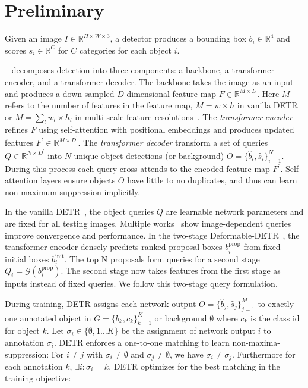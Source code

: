 \documentclass[10pt,twocolumn,letterpaper]{article}
\newcommand{\myparagraph}[1]{\vspace{2pt}\noindent{\textbf{#1}}}
\newcommand{\prop}{{\text{prop}}}
\newcommand{\init}{{\text{init}}}
\begin{document}
\section{Preliminary}


Given an image $I\in\mathbb{R}^{H\times W\times 3}$, a detector produces a bounding box $b_i\in\mathbb{R}^4$ and scores $s_i\in\mathbb{R}^{C}$ for $C$ categories for each object $i$.

\myparagraph{DETR}~\cite{carion2020end} decomposes detection into three components: a backbone, a transformer encoder, and a transformer decoder.
The backbone takes the image as an input and produces a down-sampled $D$-dimensional feature map $F\in\mathbb{R}^{M\times D}$.
Here $M$ refers to the number of features in the feature map,
$M=w \times h$ in vanilla DETR~\cite{carion2020end} or $M=\sum_l w_l \times h_l$ in multi-scale feature resolutions~\cite{zhu2020deformable}.
The \emph{transformer encoder} refines $F$ using self-attention with positional embeddings and produces updated features $F^\prime\in\mathbb{R}^{M \times D^\prime}$.
The \emph{transformer decoder} transform a set of queries $Q\in \mathbb{R}^{N\times D^\prime}$ into $N$ unique object detections (or background) $O = \{\hat{b}_i, \hat{s}_i\}_{i=1}^N$.
During this process each query cross-attends to the encoded feature map $F^\prime$.
Self-attention layers ensure objects $O$ have little to no duplicates, and thus can learn non-maximum-suppression implicitly.










\myparagraph{Two-stage DETR.} In the vanilla DETR~\cite{carion2020end}, the object queries $Q$ are learnable network parameters and are fixed for all testing images.
Multiple works~\cite{zhu2020deformable,sun2020rethinking,yao2021efficient,zhang2022dino} show image-dependent queries improve convergence and performance.
In the two-stage Deformable-DETR~\cite{zhu2020deformable}, the transformer encoder densely predicts ranked proposal boxes $b^{\prop}_i$ from fixed initial boxes $b^{\init}_i$.
The top N proposals form queries for a second stage $Q_i = \mathcal{G}(b^{\prop}_i)$.
The second stage now takes features from the first stage as inputs instead of fixed queries.
We follow this two-stage query formulation.


\myparagraph{Hungarian matching loss.}
During training, DETR assigns each network output $O=\{\hat b_j, \hat s_j\}_{j=1}^{M}$ to exactly one annotated object in $G=\{b_k, c_k\}_{k=1}^{K}$ or background $\emptyset$ where $c_k$ is the class id for object $k$.
Let $\sigma_i \in \{\emptyset, 1 \ldots K\}$ be the assignment of network output $i$ to annotation $\sigma_i$.
DETR enforces a one-to-one matching to learn non-maxima-suppression: For $i \ne j$ with $\sigma_i\ne\emptyset$ and $\sigma_j\ne\emptyset$, we have $\sigma_i \ne \sigma_j$.
Furthermore for each annotation $k$, $\exists i : \sigma_i=k$.
DETR optimizes for the best matching in the training objective:
\end{document}

